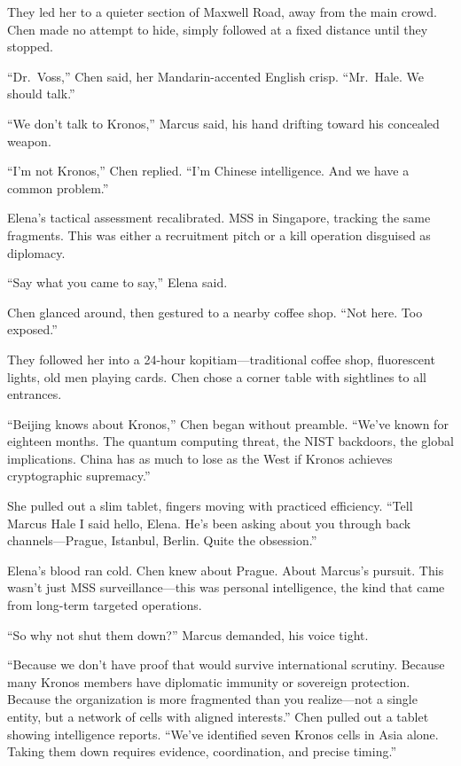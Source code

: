 They led her to a quieter section of Maxwell Road, away from the main crowd. Chen made no attempt to hide, simply followed at a fixed distance until they stopped.

``Dr.~Voss,'' Chen said, her Mandarin-accented English crisp. ``Mr.~Hale. We should talk.''

``We don't talk to Kronos,'' Marcus said, his hand drifting toward his concealed weapon.

``I'm not Kronos,'' Chen replied. ``I'm Chinese intelligence. And we have a common problem.''

Elena's tactical assessment recalibrated. MSS in Singapore, tracking the same fragments. This was either a recruitment pitch or a kill operation disguised as diplomacy.

``Say what you came to say,'' Elena said.

Chen glanced around, then gestured to a nearby coffee shop. ``Not here. Too exposed.''

They followed her into a 24-hour kopitiam---traditional coffee shop, fluorescent lights, old men playing cards. Chen chose a corner table with sightlines to all entrances.

``Beijing knows about Kronos,'' Chen began without preamble. ``We've known for eighteen months. The quantum computing threat, the NIST backdoors, the global implications. China has as much to lose as the West if Kronos achieves cryptographic supremacy.''

She pulled out a slim tablet, fingers moving with practiced efficiency. ``Tell Marcus Hale I said hello, Elena. He's been asking about you through back channels---Prague, Istanbul, Berlin. Quite the obsession.''

Elena's blood ran cold. Chen knew about Prague. About Marcus's pursuit. This wasn't just MSS surveillance---this was personal intelligence, the kind that came from long-term targeted operations.

``So why not shut them down?'' Marcus demanded, his voice tight.

``Because we don't have proof that would survive international scrutiny. Because many Kronos members have diplomatic immunity or sovereign protection. Because the organization is more fragmented than you realize---not a single entity, but a network of cells with aligned interests.'' Chen pulled out a tablet showing intelligence reports. ``We've identified seven Kronos cells in Asia alone. Taking them down requires evidence, coordination, and precise timing.''

